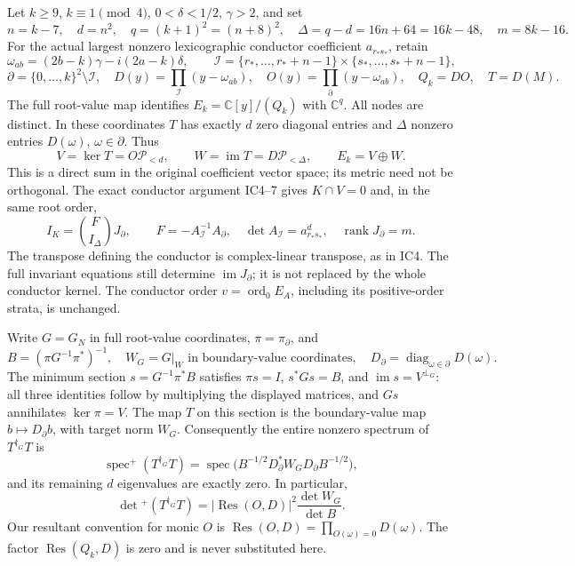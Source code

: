\documentclass[11pt]{article}
\begin{document}
Let \(k\ge9\), \(k\equiv1\pmod4\), \(0<\delta<1/2\), \(\gamma>2\), and set \[
n=k-7,\quad d=n^2,\quad q=(k+1)^2=(n+8)^2,\quad
\Delta=q-d=16n+64=16k-48,\quad m=8k-16.
\tag{FW1}
\] For the actual largest nonzero lexicographic conductor coefficient \(a_{r_*s_*}\), retain \[
\omega_{ab}=(2b-k)\gamma-i(2a-k)\delta,\qquad
\mathcal I=\{r_*,\ldots,r_*+n-1\}\times\{s_*,\ldots,s_*+n-1\},
\] \[
\partial=\{0,\ldots,k\}^2\setminus\mathcal I,\quad
D(y)=\prod_{\mathcal I}(y-\omega_{ab}),\quad O(y)=\prod_\partial(y-\omega_{ab}),
\quad Q_k=DO,\quad T=D(M).
\] The full root-value map identifies \(E_k=\mathbb C[y]/(Q_k)\) with \(\mathbb C^q\). All nodes are distinct. In these coordinates \(T\) has exactly \(d\) zero diagonal entries and \(\Delta\) nonzero entries \(D(\omega)\), \(\omega\in\partial\). Thus \[
V=\ker T=O\mathcal P_{<d},\qquad W=\operatorname{im}T=D\mathcal P_{<\Delta},
\qquad E_k=V\oplus W.
\tag{FW2}
\] This is a direct sum in the original coefficient vector space; its metric need not be orthogonal. The exact conductor argument IC4--7 gives \(K\cap V=0\) and, in the same root order, \[
I_K=\binom F{I_\Delta}J_\partial,\qquad
F=-A_\mathcal I^{-1}A_\partial,\quad
\det A_\mathcal I=a_{r_*s_*}^{d},\quad \operatorname{rank}J_\partial=m.
\tag{FW3}
\] The transpose defining the conductor is complex-linear transpose, as in IC4. The full invariant equations still determine \(\operatorname{im}J_\partial\); it is not replaced by the whole conductor kernel. The conductor order \(v=\operatorname{ord}_0E_A\), including its positive-order strata, is unchanged.

Write \(G=G_N\) in full root-value coordinates, \(\pi=\pi_\partial\), and \[
B=(\pi G^{-1}\pi^*)^{-1},\quad
W_G=G|_W\text{ in boundary-value coordinates},\quad
D_\partial=\operatorname{diag}_{\omega\in\partial}D(\omega).
\] The minimum section \(s=G^{-1}\pi^*B\) satisfies \(\pi s=I\), \(s^*Gs=B\), and \(\operatorname{im}s=V^{\perp_G}\): all three identities follow by multiplying the displayed matrices, and \(Gs\) annihilates \(\ker\pi=V\). The map \(T\) on this section is the boundary-value map \(b\mapsto D_\partial b\), with target norm \(W_G\). Consequently the entire nonzero spectrum of \(T^{\dagger_G}T\) is \[
\operatorname{spec}^+(T^{\dagger_G}T)
=\operatorname{spec}\bigl(B^{-1/2}D_\partial^*W_GD_\partial B^{-1/2}\bigr),
\tag{FW4}
\] and its remaining \(d\) eigenvalues are exactly zero. In particular, \[
\det{}^+(T^{\dagger_G}T)=|\operatorname{Res}(O,D)|^2\frac{\det W_G}{\det B}.
\tag{FW5}
\] Our resultant convention for monic \(O\) is \(\operatorname{Res}(O,D)=\prod_{O(\omega)=0}D(\omega)\). The factor \(\operatorname{Res}(Q_k,D)\) is zero and is never substituted here.
\end{document}
